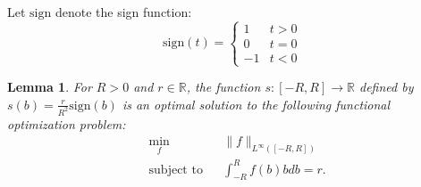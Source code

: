 \documentclass[twoside]{article}
\newtheorem{lemma}{Lemma}
\theoremstyle{definition}
\newcommand{\R}{\mathbb{R}}
\newcommand{\sign}{\mathrm{sign}}
\newcommand{\1}[1]{\scalebox{1.25}{$\mathds{1}$}\left[#1\right]}
\begin{document}
Let $\mathrm{sign}$ denote the sign function:
$$
\mathrm{sign}(t)=\begin{cases}
1  & t >0 \\
0 & t = 0 \\
-1 & t < 0
\end{cases}
$$

\begin{lemma}
For $R>0$ and $r\in\R$, the function $s:[-R,R]\to \R$ defined by $s(b)=\frac{r}{R^2}\sign(b)$ is an optimal solution to the following functional optimization problem:
\begin{align*}
&\min_{f} && \|f\|_{L^{\infty}([-R,R])}\\
&\textrm{subject to} && \int_{-R}^{R}f(b)bdb =r. 
\end{align*}
\end{lemma}
\end{document}
